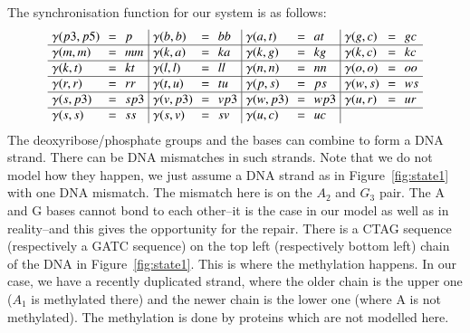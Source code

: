 The synchronisation function for our system is as follows:
%
\[\arraycolsep=3.4pt\def\arraystretch{1.0}
\begin{array}{ l c l | l c l | l c l | l c l}
\gamma(p3,p5) & = & p & \gamma(b,b) & = & bb & \gamma(a,t) & = & at &  \gamma(g,c) & = & gc \\
\hline
\gamma(m,m) & = & mm & \gamma(k,a) & = & ka & \gamma(k, g) & = & kg & \gamma(k,c) & = & kc \\
\hline
\gamma(k,t) & = & kt & \gamma(l,l) & = & ll &\gamma(n,n) & = & nn & \gamma(o,o) & = & oo\\
\hline
\gamma(r,r) & = & rr & \gamma(t,u) & = & tu &\gamma(p,s) & = & ps &\gamma(w,s) & = & ws\\
\hline
\gamma(s,p3) & = & sp3 &  \gamma(v,p3) & = & vp3 &\gamma(w,p3) & = & wp3  & \gamma(u,r) & = & ur \\
\hline
\gamma(s,s) & = & ss & \gamma(s,v) & = & sv & \gamma(u,c) &=  & uc &  \\
\end{array}
\]
The deoxyribose/phosphate groups and the bases can combine to form a DNA strand. There can be DNA mismatches in such strands. Note that we do not model how they happen, we just assume a DNA strand as in Figure~\ref{fig:state1} with one DNA mismatch. %
The mismatch here is on the $A_2$ and $G_3$ pair.
The A and G bases cannot bond to each other--it is the case in our model as well as in reality--and this gives the opportunity for the repair. There is a CTAG sequence (respectively a GATC sequence) on the top left (respectively bottom left)
chain of the DNA in Figure~\ref{fig:state1}. This is where the methylation happens. In our case, we have a recently duplicated strand, where the older chain is the upper one ($A_1$ is methylated there) and the newer chain is the lower one (where A is not methylated). The methylation is done by proteins which are not modelled here.

